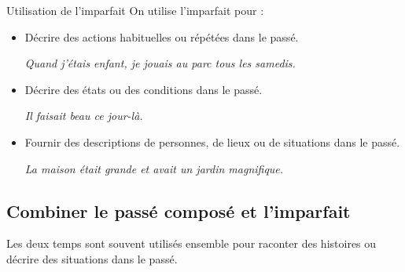 \begin{frbox}[violet]{Utilisation de l'imparfait}
    On utilise l'imparfait pour :
    \begin{itemize}
        \item Décrire des actions habituelles ou répétées dans le passé.
        
        \qquad\textit{Quand j'étais enfant, je jouais au parc tous les samedis.}
        \item Décrire des états ou des conditions dans le passé.
        
        \qquad\textit{Il faisait beau ce jour-là.}
        \item Fournir des descriptions de personnes, de lieux ou de situations dans le passé.
        
        \qquad\textit{La maison était grande et avait un jardin magnifique.}
    \end{itemize}
\end{frbox}

\subsection{Combiner le passé composé et l'imparfait}

Les deux temps sont souvent utilisés ensemble pour raconter des histoires ou décrire des situations
dans le passé.